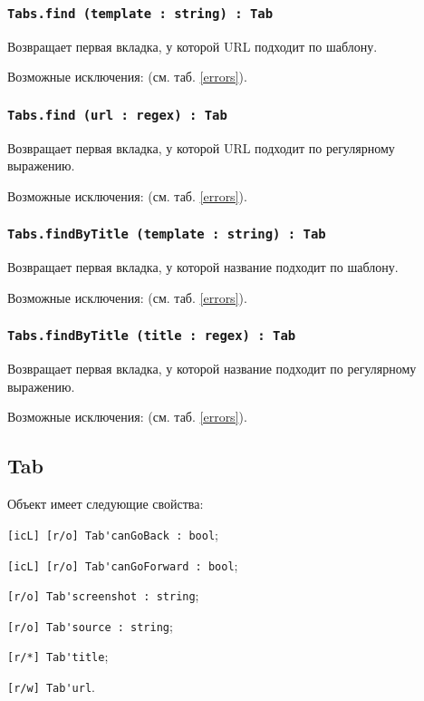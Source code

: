 \subsubsection{\lstinline|Tabs.find (template : string) : Tab|}

Возвращает первая вкладка, у которой URL подходит по шаблону.

Возможные исключения:  (см. таб. \ref{errors}).

\subsubsection{\lstinline|Tabs.find (url : regex) : Tab|}

Возвращает первая вкладка, у которой URL подходит по регулярному выражению.

Возможные исключения:  (см. таб. \ref{errors}).

\subsubsection{\lstinline|Tabs.findByTitle (template : string) : Tab|}

Возвращает первая вкладка, у которой название подходит по шаблону.

Возможные исключения:  (см. таб. \ref{errors}).

\subsubsection{\lstinline|Tabs.findByTitle (title : regex) : Tab|}

Возвращает первая вкладка, у которой название подходит по регулярному выражению.

Возможные исключения:  (см. таб. \ref{errors}).

\subsection{{\color{orange} Tab}}

Объект \tab{} имеет следующие свойства:
\begin{icItems}
	\item \lstinline|[icL] [r/o] Tab'canGoBack : bool|;
	\item \lstinline|[icL] [r/o] Tab'canGoForward : bool|;
	\item \lstinline|[r/o] Tab'screenshot : string|;
	\item \lstinline|[r/o] Tab'source : string|;
	\item \lstinline|[r/*] Tab'title|;
	\item \lstinline|[r/w] Tab'url|.
\end{icItems}

